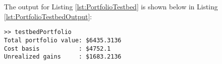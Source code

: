 The output for Listing \ref{lst:PortfolioTestbed} is shown below in Listing \ref{lst:PortfolioTestbedOutput}:
\begin{lstlisting}[style=Matlab-editor, caption={Output generated by \texttt{testbedPortfolio.m}, listed in Listing \ref{lst:PortfolioTestbed}.}, label={lst:PortfolioTestbedOutput}]
>> testbedPortfolio
Total portfolio value: $6435.3136
Cost basis           : $4752.1
Unrealized gains     : $1683.2136
\end{lstlisting}



\clearpage